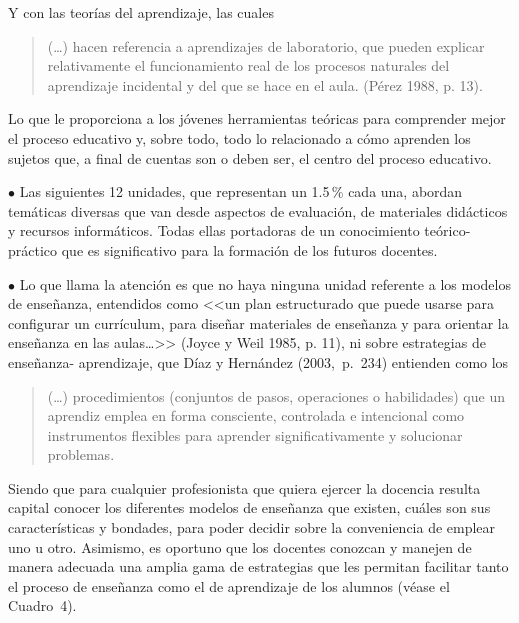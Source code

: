 Y con las teorías del aprendizaje, las cuales 

\begin{quotation} 
(\ldots) hacen referencia a 
aprendizajes de laboratorio, que pueden explicar relativamente el 
funcionamiento real de los procesos naturales del aprendizaje 
incidental y del que se hace en el aula. (Pérez 1988, p. 13). 
\end{quotation} 

Lo que le proporciona a los jóvenes herramientas teóricas para comprender 
mejor el proceso educativo y, sobre todo, todo lo relacionado a cómo 
aprenden los sujetos que, a final de cuentas son o deben ser, el 
centro del proceso educativo.
\enlargethispage{1\baselineskip}

\begin{Obs} 
\item[$\bullet$] Las siguientes 12 unidades, que 
representan un 1.5\,\% cada una, abordan temáticas diversas que van desde 
aspectos de evaluación, de materiales didácticos y recursos 
informáticos. Todas ellas portadoras de un conocimiento teórico-práctico que es 
significativo para la formación de los futuros docentes.  
\item[$\bullet$] Lo que llama la atención es que no haya ninguna 
unidad referente a los modelos de enseñanza,  entendidos como <<un plan 
estructurado que puede usarse para configurar un currículum, para 
diseñar materiales de enseñanza y para orientar la enseñanza en las 
aulas\ldots>> (Joyce y Weil 1985, p. 11), ni sobre estrategias de enseñanza- 
aprendizaje,  que Díaz y Hernández (2003,~p.~234) entienden como los 

\begin{quotation}
(\ldots) procedimientos (conjuntos de pasos, operaciones o habilidades) que un 
aprendiz emplea en forma consciente, controlada e intencional como 
instrumentos flexibles para aprender significativamente y solucionar 
problemas.   
\end{quotation}


Siendo que para cualquier profesionista que quiera ejercer la docencia 
resulta capital conocer los diferentes modelos de enseñanza que existen, 
cuáles son sus características y bondades, para poder decidir sobre la 
conveniencia de emplear uno u otro. Asimismo, es oportuno que los 
docentes conozcan y manejen de manera adecuada una amplia gama de 
estrategias que les permitan facilitar tanto el proceso de enseñanza 
como el de aprendizaje de los alumnos (véase el Cuadro~4). 
\end{Obs} 

